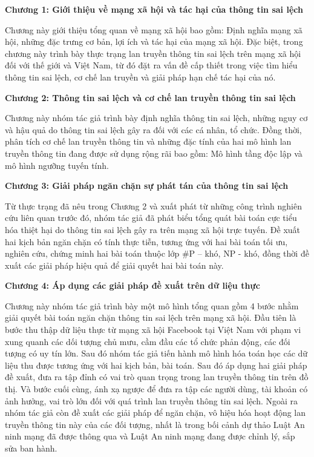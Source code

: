 {\bfseries Chương 1: Giới thiệu về mạng xã hội và tác hại của thông tin sai lệch}

Chương này giới thiệu tổng quan về mạng xã hội bao gồm: Định nghĩa mạng xã hội, những đặc trưng cơ bản, lợi ích và tác hại của mạng xã hội. Đặc biệt, trong chương này trình bày thực trạng lan truyền thông tin sai lệch trên mạng xã hội đối với thế giới và Việt Nam, từ đó đặt ra vấn đề cấp thiết trong việc tìm hiểu thông tin sai lệch, cơ chế lan truyền và giải pháp hạn chế tác hại của nó.

{\bfseries Chương 2: Thông tin sai lệch và cơ chế lan truyền thông tin sai lệch}

Chương này nhóm tác giả trình bày định nghĩa thông tin sai lệch, những nguy cơ và hậu quả do thông tin sai lệch gây ra đối với các cá nhân, tổ chức. Đồng thời, phân tích cơ chế lan truyền thông tin và những đặc tính của hai mô hình lan truyền thông tin đang được sử dụng rộng rãi bao gồm: Mô hình tầng độc lập và mô hình ngưỡng tuyến tính.

{\bfseries Chương 3: Giải pháp ngăn chặn sự phát tán của thông tin sai lệch}

Từ thực trạng đã nêu trong Chương 2 và xuất phát từ những công trình nghiên cứu liên quan trước đó, nhóm tác giả đã phát biểu tổng quát bài toán cực tiểu hóa thiệt hại do thông tin sai lệch gây ra trên mạng xã hội trực tuyến. Đề xuất hai kịch bản ngăn chặn có tính thực tiễn, tương ứng với hai bài toán tối ưu, nghiên cứu, chứng minh hai bài toán thuộc lớp \#P – khó, NP - khó, đồng thời đề xuất các giải pháp hiệu quả để giải quyết hai bài toán này.

{\bfseries Chương 4: Áp dụng các giải pháp đề xuất trên dữ liệu thực}

Chương này nhóm tác giả trình bày một mô hình tổng quan gồm 4 bước nhằm giải quyết bài toán ngăn chặn thông tin sai lệch trên mạng xã hội. Đầu tiên là bước thu thập dữ liệu thực từ mạng xã hội Facebook tại Việt Nam với phạm vi xung quanh các dối tượng chủ mưu, cầm đầu các tổ chức phản động, các đối tượng có uy tín lớn. Sau đó nhóm tác giả tiến hành mô hình hóa toán học các dữ liệu thu được tương ứng với hai kịch bản, bài toán. Sau đó áp dụng hai giải pháp đề xuất, đưa ra tập đỉnh có vai trò quan trọng trong lan truyền thông tin trên đồ thị. Và bước cuối cùng, ánh xạ ngược để đưa ra tập các người dùng, tài khoản có ảnh hưởng, vai trò lớn đối với quá trình lan truyền thông tin sai lệch. Ngoài ra nhóm tác giả còn đề xuất các giải pháp để ngăn chặn, vô hiệu hóa hoạt động lan truyền thông tin này của các đối tượng, nhất là trong bối cảnh dự thảo Luật An ninh mạng đã được thông qua và Luật An ninh mạng đang được chỉnh lý, sắp sửa ban hành.